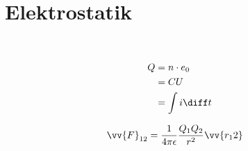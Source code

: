 \section{Elektrostatik}

\begin{boxleft}
\\
\end{boxleft}\begin{boxrightshaded}
\begin{align}
Q	&=n\cdot e_0\\
	&=CU\\
	&=\int i \diff t
\end{align}
\end{boxrightshaded}


\begin{boxleft}
\end{boxleft}\begin{boxrightshaded}
\begin{align}
\vv{F}_{12}&=\frac{1}{4\pi\epsilon}\frac{Q_1Q_2}{r^2}\vv{r_12}
\end{align}
\end{boxrightshaded}